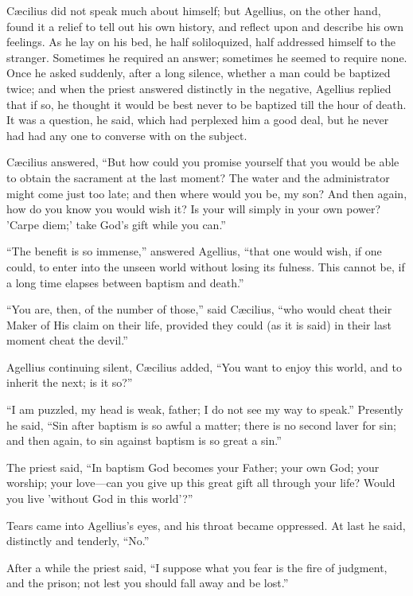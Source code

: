 Cæcilius did not speak much about himself; but Agellius, on the
other hand, found it a relief to tell out his own history, and reflect
upon and describe his own feelings. As he lay on his bed, he half
soliloquized, half addressed himself to the stranger. Sometimes he
required an answer; sometimes he seemed to require none. Once he asked
suddenly, after a long silence, whether a man could be baptized twice;
and when the priest answered distinctly in the negative, Agellius
replied that if so, he thought it would be best never to be baptized
till the hour of death. It was a question, he said, which had
perplexed him a good deal, but he never had had any one to converse
with on the subject.

Cæcilius answered, ``But how could you promise yourself that
you would be able to obtain the sacrament at the last moment?
The water and the administrator might come just too late; and then
where would you be, my son? And then again, how do you know you would
wish it? Is your will simply in your own power? 'Carpe diem;' take God's
gift while you can.''

``The benefit is so immense,'' answered Agellius,
``that one would wish, if one could, to enter into the unseen
world without losing its fulness. This cannot be, if a long time
elapses between baptism and death.''

``You are, then, of the number of those,'' said Cæcilius,
``who would cheat their Maker of His claim on their life, provided
they could (as it is said) in their last moment cheat the devil.''

Agellius continuing silent, Cæcilius added, ``You want to
enjoy this world, and to inherit the next; is it so?''

``I am puzzled, my head is weak, father; I do not see my way to
speak.'' Presently he said, ``Sin after baptism is so awful a
matter; there is no second laver for sin; and then again, to sin
against baptism is so great a sin.''

The priest said, ``In baptism God becomes your Father; your own
God; your worship; your love—can you give up this great gift all
through your life? Would you live 'without God in this world'?''

Tears came into Agellius's eyes, and his throat became oppressed.
At last he said, distinctly and tenderly, ``No.''

After a while the priest said, ``I suppose what you fear is the
fire of judgment, and the prison; not lest you should fall away and be
lost.''

